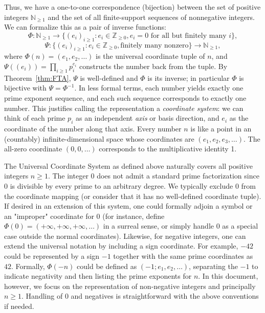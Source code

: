 \documentclass[11pt]{article}
\begin{document}
Thus, we have a one-to-one correspondence (bijection) between the set of positive integers $\mathbb{N}_{\ge 1}$ and the set of all finite-support sequences of nonnegative integers. We can formalize this as a pair of inverse functions:
\[
\Phi: \mathbb{N}_{\ge 1} \to \{(e_i)_{i\ge1}: e_i \in \mathbb{Z}_{\ge0}, e_i = 0 \text{ for all but finitely many }i\},
\] 
\[ 
\Psi: \{(e_i)_{i\ge1}: e_i \in \mathbb{Z}_{\ge0}, \text{finitely many nonzero}\} \to \mathbb{N}_{\ge 1},
\] 
where $\Phi(n) = (e_1,e_2,\ldots)$ is the universal coordinate tuple of $n$, and $\Psi((e_i)) = \prod_{i\ge1} p_i^{e_i}$ constructs the number back from the tuple. By Theorem~\ref{thm:FTA}, $\Psi$ is well-defined and $\Phi$ is its inverse; in particular $\Phi$ is bijective with $\Psi = \Phi^{-1}$. In less formal terms, each number yields exactly one prime exponent sequence, and each such sequence corresponds to exactly one number. This justifies calling the representation a \emph{coordinate system}: we can think of each prime $p_i$ as an independent \emph{axis} or basis direction, and $e_i$ as the coordinate of the number along that axis. Every number $n$ is like a point in an (countably) infinite-dimensional space whose coordinates are $(e_1, e_2, e_3,\dots)$. The all-zero coordinate $(0,0,\dots)$ corresponds to the multiplicative identity 1.

\begin{remark}
The Universal Coordinate System as defined above naturally covers all positive integers $n \ge 1$. The integer $0$ does not admit a standard prime factorization since $0$ is divisible by every prime to an arbitrary degree. We typically exclude 0 from the coordinate mapping (or consider that it has no well-defined coordinate tuple). If desired in an extension of this system, one could formally adjoin a symbol or an "improper" coordinate for 0 (for instance, define $\Phi(0) = (+\infty, +\infty, +\infty, \dots)$ in a surreal sense, or simply handle 0 as a special case outside the normal coordinates). Likewise, for negative integers, one can extend the universal notation by including a sign coordinate. For example, $-42$ could be represented by a sign $-1$ together with the same prime coordinates as $42$. Formally, $\Phi(-n)$ could be defined as $(-1; e_1, e_2, \ldots)$, separating the $-1$ to indicate negativity and then listing the prime exponents for $n$. In this document, however, we focus on the representation of non-negative integers and principally $n \ge 1$. Handling of $0$ and negatives is straightforward with the above conventions if needed.
\end{remark}
\end{document}
